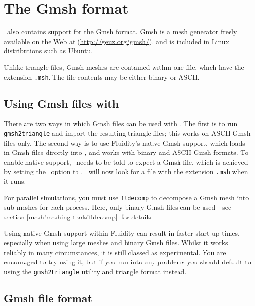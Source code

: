 \section{The Gmsh format}\label{sect:gmsh_format}


\fluidity\ also contains  support for the Gmsh format. Gmsh is a mesh
generator freely available on the Web at (\url{http://geuz.org/gmsh/}), and 
is included in Linux distributions such as Ubuntu. 

Unlike triangle files, Gmsh meshes are contained within one file, which have
the extension \lstinline[language=bash]+.msh+. The file contents may
be either binary or ASCII.

\subsection{Using Gmsh files with \fluidity}\label{sect:using_gmsh}

There are two ways in which Gmsh files can be used with \fluidity. The first
is to run \lstinline[language=Bash]{gmsh2triangle} and import the resulting
triangle files; this works on ASCII Gmsh files only. The second way is to 
use Fluidity's native Gmsh support, which loads in Gmsh files directly into
\fluidity, and works with binary and ASCII Gmsh formats. To enable native 
support, \fluidity\ needs to be told to expect a Gmsh file, which is achieved 
by setting the \onlypdf{}\ option 
to \onlypdf{}.  \fluidity\ will now look for a file with the extension 
\lstinline[language=bash]+.msh+ when it runs.

For parallel simulations, you must use \lstinline[language=bash]+fldecomp+ to decompose a Gmsh
mesh into sub-meshes for each process. Here, only binary Gmsh files can be
used - see section \ref{mesh!meshing tools!fldecomp}\ for details.

Using native Gmsh support within Fluidity can result in faster start-up times,
especially when using large meshes and binary Gmsh files. Whilst it works
reliably in many circumstances, it is still classed as experimental.  You are 
encouraged to try using it, but if you run into any problems you should
 default to using the
\lstinline[language=bash]+gmsh2triangle+ utility and triangle format
instead.

\subsection{Gmsh file format}\label{sect:gmsh_file_format}


